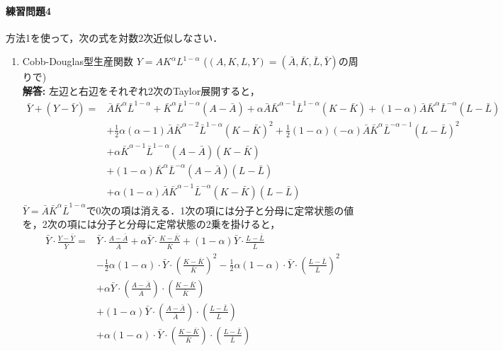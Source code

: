 \documentclass[a4paper,12pt,onecolumn,oneside,notitlepage,final]{article}
\begin{document}
\paragraph{練習問題4} 方法1を使って，次の式を対数2次近似しなさい．
\begin{enumerate}
\item Cobb-Douglas型生産関数 $Y = AK^\alpha L^{1-\alpha}$ \quad ($(A,K,L,Y) = (\bar A, \bar K, \bar L, \bar Y)$の周りで)\\

{\bf 解答:} 左辺と右辺をそれぞれ2次のTaylor展開すると，
\begin{align*}
\bar Y + (Y - \bar Y) = &\bar A \bar K^\alpha \bar L^{1-\alpha} + \bar K^\alpha \bar L^{1-\alpha} (A-\bar A) + \alpha \bar A \bar K^{\alpha-1} \bar L^{1-\alpha} (K-\bar K) + (1-\alpha) \bar A \bar K^\alpha \bar L^{-\alpha} (L-\bar L)\\
&+\frac{1}{2} \alpha (\alpha -1)\bar A \bar K^{\alpha -2} \bar L^{1-\alpha} (K-\bar K)^2 + \frac{1}{2} (1-\alpha) (-\alpha) \bar A \bar K^\alpha \bar L^{-\alpha-1} (L-\bar L)^2\\
&+ \alpha \bar K^{\alpha -1} \bar L^{1-\alpha} (A - \bar A)(K - \bar K) \\
&+ (1-\alpha) \bar K^\alpha \bar L^{-\alpha} (A - \bar A) (L-\bar L) \\
&+ \alpha (1-\alpha) \bar A \bar K^{\alpha-1} \bar L^{-\alpha} (K-\bar K) (L-\bar L) 
\end{align*}
$\bar Y = \bar A \bar K^\alpha \bar L^{1-\alpha}$で0次の項は消える．1次の項には分子と分母に定常状態の値を，2次の項には分子と分母に定常状態の2乗を掛けると，
\begin{align*}
\bar Y \cdot \frac{Y - \bar Y}{\bar Y} = &\bar Y \cdot \frac{A-\bar A}{\bar A} + \alpha \bar Y \cdot \frac{K-\bar K}{\bar K} + (1-\alpha) \bar Y \cdot\frac{L-\bar L}{\bar L}\\
&-\frac{1}{2} \alpha (1-\alpha) \cdot \bar Y \cdot \left(\frac{K-\bar K}{\bar K}\right)^2 - \frac{1}{2} \alpha (1-\alpha) \cdot \bar Y \cdot \left(\frac{L-\bar L}{\bar L}\right)^2 \\
&+ \alpha \bar Y \cdot \left(\frac{A-\bar A}{\bar A}\right) \cdot\left(\frac{K-\bar K}{\bar K}\right)\\
&+ (1-\alpha) \bar Y \cdot \left(\frac{A-\bar A}{\bar A}\right) \cdot \left(\frac{L - \bar L}{\bar L}\right)\\
&+ \alpha (1-\alpha) \cdot \bar Y \cdot \left(\frac{K-\bar K}{\bar K}\right) \cdot \left(\frac{L-\bar L}{\bar L}\right)
\end{align*}

\end{enumerate}
\end{document}
